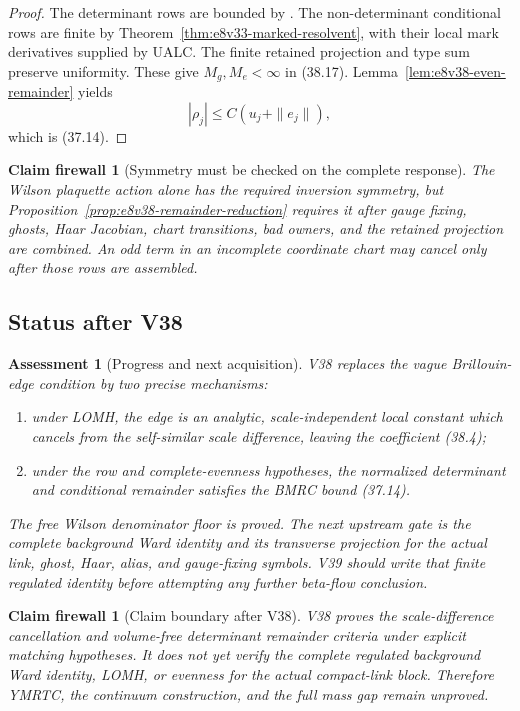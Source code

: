 \documentclass[11pt,oneside]{book}
\newtheorem{assessment}[theorem]{Assessment}
\newtheorem{firewall}[theorem]{Claim firewall}
\theoremstyle{definition}
\theoremstyle{remark}
\begin{document}
\begin{proof}
The determinant rows are bounded by
.
The non-determinant conditional rows are finite by
Theorem~\ref{thm:e8v33-marked-resolvent}, with their local mark
derivatives supplied by UALC.  The finite retained projection and
type sum preserve uniformity.  These give \(M_g,M_e<\infty\) in
(38.17).  Lemma~\ref{lem:e8v38-even-remainder} yields
\[
 |\rho_j|\leq C(u_j+\|e_j\|),
\]
which is (37.14).
\end{proof}

\begin{firewall}[Symmetry must be checked on the complete response]
\label{fire:e8v38-evenness}
The Wilson plaquette action alone has the required inversion
symmetry, but Proposition~\ref{prop:e8v38-remainder-reduction}
requires it after gauge fixing, ghosts, Haar Jacobian, chart
transitions, bad owners, and the retained projection are combined.
An odd term in an incomplete coordinate chart may cancel only after
those rows are assembled.
\end{firewall}

\subsection{Status after V38}

\begin{assessment}[Progress and next acquisition]
\label{ass:e8v38-status}
V38 replaces the vague Brillouin-edge condition by two precise
mechanisms:
\begin{enumerate}
\item under LOMH, the edge is an analytic, scale-independent local
      constant which cancels from the self-similar scale difference,
      leaving the coefficient (38.4);
\item under the row and complete-evenness hypotheses, the normalized
      determinant and conditional remainder satisfies the BMRC
      bound (37.14).
\end{enumerate}
The free Wilson denominator floor is proved.  The next upstream gate
is the complete background Ward identity and its transverse
projection for the actual link, ghost, Haar, alias, and gauge-fixing
symbols.  V39 should write that finite regulated identity before
attempting any further beta-flow conclusion.
\end{assessment}

\begin{firewall}[Claim boundary after V38]
\label{fire:e8v38-claim}
V38 proves the scale-difference cancellation and volume-free
determinant remainder criteria under explicit matching hypotheses.
It does not yet verify the complete regulated background Ward
identity, LOMH, or evenness for the actual compact-link block.
Therefore YMRTC, the continuum construction, and the full mass gap
remain unproved.
\end{firewall}
\end{document}

